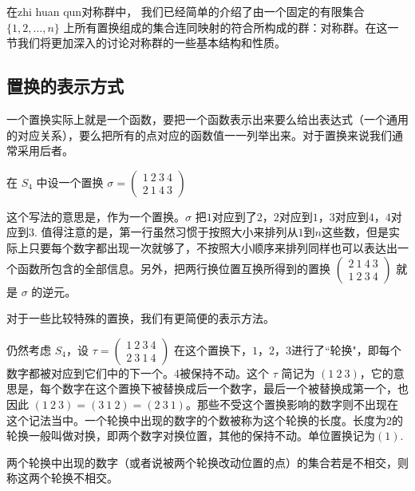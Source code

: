 

在zhi huan qun对称群中， 我们已经简单的介绍了由一个固定的有限集合 $\{1, 2, ..., n\}$ 上所有置换组成的集合连同映射的符合所构成的群：对称群。在这一节我们将更加深入的讨论对称群的一些基本结构和性质。

\subsection{置换的表示方式}
一个置换实际上就是一个函数，要把一个函数表示出来要么给出表达式（一个通用的对应关系），要么把所有的点对应的函数值一一列举出来。对于置换来说我们通常采用后者。
\begin{example}{}\label{ex_permu_1}
在 $S_4$ 中设一个置换 $\sigma=\begin{pmatrix}
1\ 2\ 3\ 4\\ 2\ 1\ 4\ 3
\end{pmatrix}$
\end{example}
这个写法的意思是，作为一个置换。$\sigma$ 把$1$对应到了$2$，$2$对应到$1$，$3$对应到$4$，$4$对应到$3$. 值得注意的是，第一行虽然习惯于按照大小来排列从$1$到$n$这些数，但是实际上只要每个数字都出现一次就够了，不按照大小顺序来排列同样也可以表达出一个函数所包含的全部信息。另外，把两行换位置互换所得到的置换
$\begin{pmatrix}
2\ 1\ 4\ 3\\ 1\ 2\ 3\ 4
\end{pmatrix}$
就是 $\sigma$ 的逆元。


对于一些比较特殊的置换，我们有更简便的表示方法。
\begin{example}{}
仍然考虑 $S_4$，设 $\tau=\begin{pmatrix}
1\ 2\ 3\ 4\\ 2\ 3\ 1\ 4
\end{pmatrix}$ 在这个置换下，$1$，$2$，$3$进行了“轮换"，即每个数字都被对应到它们中的下一个。4被保持不动。这个 $\tau$ 简记为 $(1\ 2\ 3)$，它的意思是，每个数字在这个置换下被替换成后一个数字，最后一个被替换成第一个，也因此 $(1\ 2\ 3)=(3\ 1\ 2)=(2\ 3\ 1)$。那些不受这个置换影响的数字则不出现在这个记法当中。一个轮换中出现的数字的个数被称为这个轮换的长度。长度为$2$的轮换一般叫做对换，即两个数字对换位置，其他的保持不动。单位置换记为$(1)$.
\end{example}

\begin{definition}{}
两个轮换中出现的数字（或者说被两个轮换改动位置的点）的集合若是不相交，则称这两个轮换不相交。
\end{definition}


